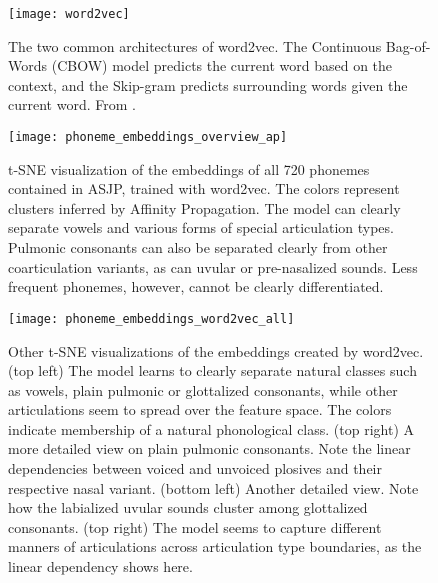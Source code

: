 \documentclass[6pt]{article}
\begin{document}
{\begin{figure}[h] %
\begin{center}
   \texttt{[image: word2vec]} 
   \caption{The two common architectures of word2vec. The Continuous Bag-of-Words (CBOW) model predicts the current word based on the
context, and the Skip-gram predicts surrounding words given the current word. From \cite{mikolov2013efficient}.}
   \label{fig:word2vec}
   \end{center}

\end{figure}


\begin{figure}[h]
\begin{center}
\texttt{[image: phoneme\_embeddings\_overview\_ap]} 
\caption{t-SNE visualization of the embeddings of all 720 phonemes contained in ASJP, trained with word2vec. The colors represent clusters inferred by Affinity Propagation. The model can clearly separate vowels and various forms of special articulation types. Pulmonic consonants can also be separated clearly from other coarticulation variants, as can uvular or pre-nasalized sounds. Less frequent phonemes, however, cannot be clearly differentiated. }
\label{fig:phoneme_embeddings_overview_ap}
\end{center}
\end{figure}

\begin{figure}[h] %
   \centering
   \texttt{[image: phoneme\_embeddings\_word2vec\_all]} 
   \caption{Other t-SNE visualizations of the embeddings created by word2vec. (top left) The model learns to clearly separate natural classes such as vowels, plain pulmonic or glottalized consonants, while other articulations seem to spread over the feature space. The colors indicate membership of a natural phonological class.  (top right) A more detailed view on plain pulmonic consonants. Note the linear dependencies between voiced and unvoiced plosives and their respective nasal variant. (bottom left) Another detailed view. Note how the labialized uvular sounds cluster among glottalized consonants. (top right) The model seems to capture different manners of articulations across articulation type boundaries, as the linear dependency shows here.}
   \label{fig:phoneme_embeddings_word2vec_all}
\end{figure}

}
\end{document}
